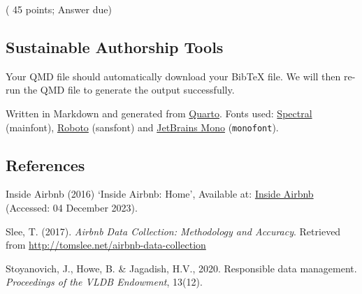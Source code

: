 \documentclass[
  a4paper,
  DIV=11,
  numbers=noendperiod]{scrartcl}
\begin{document}
( 45 points; Answer due)

\hypertarget{sustainable-authorship-tools}{%
\subsection{Sustainable Authorship
Tools}\label{sustainable-authorship-tools}}

Your QMD file should automatically download your BibTeX file. We will
then re-run the QMD file to generate the output successfully.

Written in Markdown and generated from
\href{https://quarto.org/}{Quarto}. Fonts used:
\href{https://fonts.google.com/specimen/Spectral}{Spectral} (mainfont),
\href{https://fonts.google.com/specimen/Roboto}{Roboto} ({sansfont}) and
\href{https://fonts.google.com/specimen/JetBrains\%20Mono}{JetBrains
Mono} (\texttt{monofont}).

\hypertarget{references}{%
\subsection{References}\label{references}}

Inside Airbnb (2016) `Inside Airbnb: Home', Available at:
\href{http://insideairbnb.com/}{Inside Airbnb} (Accessed: 04 December
2023).

Slee, T. (2017). \emph{Airbnb Data Collection: Methodology and
Accuracy}. Retrieved from
\url{http://tomslee.net/airbnb-data-collection}

Stoyanovich, J., Howe, B. \& Jagadish, H.V., 2020. Responsible data
management. \emph{Proceedings of the VLDB Endowment}, 13(12).
\end{document}
